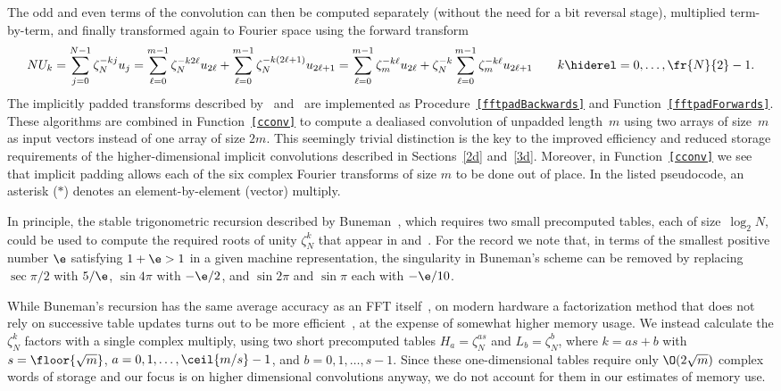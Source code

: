\documentclass[final]{siamltex}
\def\bel{\begin{dmath}}
\def\eel{\end{dmath}}
\def\no{\hiderel}
\begin{document}
The odd and even terms of the convolution can then be computed separately
(without the need for a bit reversal stage), multiplied term-by-term, and
finally transformed again to Fourier space using the forward transform
\bel
NU_k=\sum_{j=0}^{N-1}\zeta_N^{-kj} u_j
=\sum_{\ell=0}^{m-1}\zeta_N^{-k2\ell} u_{2\ell}
+\sum_{\ell=0}^{m-1}\zeta_N^{-k(2\ell+1)} u_{2\ell+1}
=\sum_{\ell=0}^{m-1}\zeta_m^{-k\ell} u_{2\ell}
+\zeta_N^{-k}\sum_{\ell=0}^{m-1}\zeta_m^{-k\ell} u_{2\ell+1}
\qquad k\no=0,\ldots,\fr{N}{2}-1.\label{cconv1forwards}
\eel
The implicitly padded transforms described by~
and~ are implemented as
Procedure~{\tt\ref{fftpadBackwards}} and Function~{\tt\ref{fftpadForwards}}.
These algorithms are combined in Function~{\tt\ref{cconv}} to 
compute a dealiased convolution of unpadded length~$m$ using
two arrays of size~$m$ as input vectors instead of one array of size $2m$.
This seemingly trivial distinction is the key to the improved efficiency
and reduced storage requirements of the higher-dimensional implicit
convolutions described in Sections~\ref{2d} and~\ref{3d}.
Moreover, in Function~{\tt\ref{cconv}} we see that implicit padding allows
each of the six complex Fourier transforms of size $m$ to be done out of place.
In the listed pseudocode, an asterisk ($*$) denotes an element-by-element
(vector) multiply.

In principle, the stable trigonometric recursion described by
Buneman~\cite{Buneman87}, which requires two small precomputed tables, each
of size~$\log_2 N$, could be used to compute the required roots of unity
$\zeta_N^k$ that appear in 
and~. For the
record we note that, in terms of the smallest positive number $\e$ 
satisfying $1+\e > 1$ in a given machine representation, the singularity in
Buneman's scheme can be removed by replacing $\sec{\pi/2}$ with  $5/\e$,
$\sin 4\pi$ with $-\e/2$, and $\sin{2\pi}$ and $\sin{\pi}$ each with $-\e/10$.

While Buneman's recursion has the same average accuracy as an FFT
itself~\cite{Tasche02}, on modern hardware a factorization method that does
not rely on successive table updates turns out to be more
efficient~\cite{Johnson09}, at the expense of somewhat higher memory usage.
We instead calculate the $\zeta_N^k$ factors with a single complex
multiply, using two short precomputed tables $H_a=\zeta_N^{as}$ and
$L_b=\zeta_N^b$, where $k=as+b$ with $s=\floor{\sqrt m}$,
$a=0,1,\ldots,\ceil{m/s}-1$, and $b=0,1,\ldots,s-1$. Since these
one-dimensional tables require only $\O(2\sqrt{m})$ complex words of
storage and our focus is on higher dimensional convolutions anyway, we do
not account for them in our estimates of memory use. 
\end{document}
